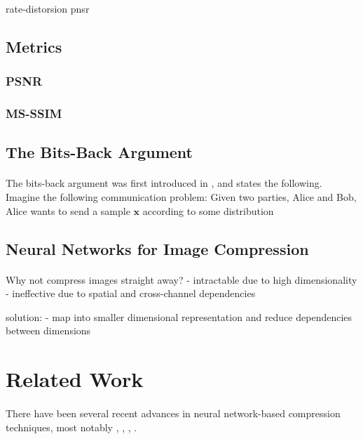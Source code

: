 \documentclass{article}
\renewcommand{\vec}[1]{\mathbf{#1}}
\begin{document}
rate-distorsion
pnsr


\cite{psnr}
\cite{msssim}
\subsection{Metrics}
\paragraph{}
\subsubsection{PSNR}
\subsubsection{MS-SSIM}
\subsection{The Bits-Back Argument}
\paragraph{}
The bits-back argument was first introduced in \cite{hinton1993keeping}, and states
the following. Imagine the following communication problem: Given two parties,
Alice and Bob, Alice wants to send a sample $\vec{x}$ according to some
distribution 

\subsection{Neural Networks for Image Compression}
\paragraph{}

Why not compress images straight away?
- intractable due to high dimensionality
- ineffective due to spatial and cross-channel dependencies

solution:
- map into smaller dimensional representation and reduce dependencies between dimensions

\section{Related Work}
\paragraph{}
There have been several recent advances in neural network-based compression
techniques, most notably \cite{balle2016end}, \cite{theis2017lossy},
\cite{rippel2017real}, \cite{balle2018variational}. 
\end{document}
